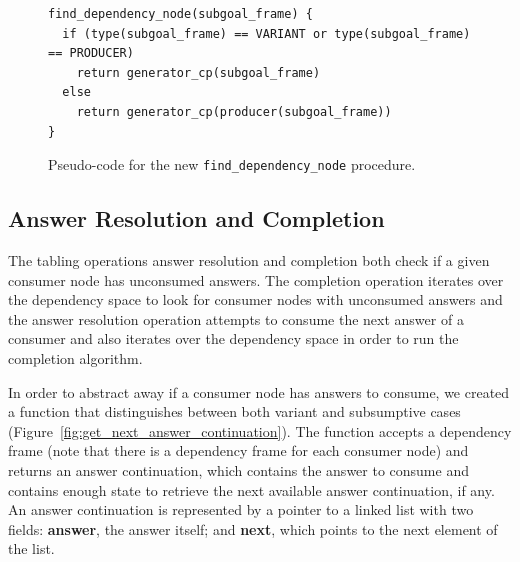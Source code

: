 \begin{figure}[ht]
\begin{Verbatim}
find_dependency_node(subgoal_frame) {
  if (type(subgoal_frame) == VARIANT or type(subgoal_frame) == PRODUCER)
    return generator_cp(subgoal_frame)
  else
    return generator_cp(producer(subgoal_frame))
}
\end{Verbatim}
\caption{Pseudo-code for the new \texttt{find\_dependency\_node} procedure.}
\label{fig:find_dependency_node}
\end{figure}

\subsection{Answer Resolution and Completion}

The tabling operations answer resolution and completion both check if a
given consumer node has unconsumed answers. The completion operation
iterates over the dependency space to look for consumer nodes with unconsumed
answers and the answer resolution operation attempts to consume the next answer
of a consumer and also iterates over the dependency space in order to run the completion algorithm.

In order to abstract away if a consumer node has answers to consume,
we created a function that distinguishes between both variant and subsumptive cases
(Figure~\ref{fig:get_next_answer_continuation}).
The function accepts a dependency frame (note that there is a dependency frame for
each consumer node) and returns an answer continuation, which contains the answer
to consume and contains enough state to retrieve the next available answer continuation, if any.
An answer continuation is represented by a pointer to a linked list with two fields:
\textbf{answer}, the answer itself; and \textbf{next}, which points to the next element of the list.

